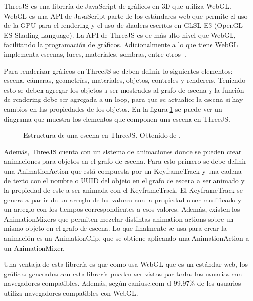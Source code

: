 ThreeJS es una librería de JavaScript de gráficos en 3D que utiliza WebGL. WebGL es una API de JavaScript parte de los estándares web que permite el uso de la GPU para el rendering y el uso de shaders escritos en GLSL ES (OpenGL ES  Shading Language). La API de ThreeJS es de más alto nivel que WebGL, facilitando la programación de gráficos. Adicionalmente a lo que tiene WebGL implementa escenas, luces, materiales, sombras, entre otros~\cite{threejs-manual}.

Para renderizar gráficos en ThreeJS se deben definir lo siguientes elementos: escena, cámaras, geometrías, materiales, objetos, controles y renderers. Teniendo esto se deben agregar los objetos a ser mostrados al grafo de escena y la función de rendering debe ser agregada a un loop, para que se actualice la escena si hay cambios en las propiedades de los objetos. En la figura \ref{fig:threejs-structure} se puede ver un diagrama que muestra los elementos que componen una escena en ThreeJS.

\begin{figure}[h]
  \centering
  
  \caption{Estructura de una escena en ThreeJS. Obtenido de \cite{threejs-manual}.}
  \label{fig:threejs-structure}
  \centering
\end{figure}

Además, ThreeJS cuenta con un sistema de animaciones donde se pueden crear animaciones para objetos en el grafo de escena. Para esto primero se debe definir una AnimationAction que está compuesta por un KeyframeTrack y una cadena de texto con el nombre o UUID del objeto en el grafo de escena a ser animado y la propiedad de este a ser animada con el KeyframeTrack. El KeyframeTrack se genera a partir de un arreglo de los valores con la propiedad a ser modificada y un arreglo con los tiempos correspondientes a esos valores. Además, existen los AnimationMixers que permiten mezclar distintas animation actions sobre un mismo objeto en el grafo de escena. Lo que finalmente se usa para crear la animación es un AnimationClip, que se obtiene aplicando una AnimationAction a un AnimationMixer.

Una ventaja de esta librería es que como usa WebGL que es un estándar web, los gráficos generados con esta librería pueden ser vistos por todos los usuarios con navegadores compatibles. Además, según caniuse.com el 99.97\% de los usuarios utiliza navegadores compatibles con WebGL.
